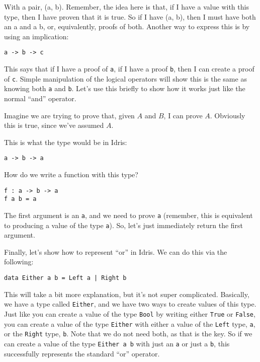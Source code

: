 \documentclass{article}
\newcommand{\inline}[1]{\texttt{#1}}
\begin{document}
With a pair, (a, b). Remember, the idea here is that, if I have a value with this type, then I have proven that it is true. So if I have (a, b), then I must have both an a and a b, or, equivalently, proofs of both. Another way to express this is by using an implication:

\begin{verbatim}
a -> b -> c
\end{verbatim}

This says that if I have a proof of \inline{a}, if I have a proof \inline{b}, then I can create a proof of \inline{c}.
Simple manipulation of the logical operators will show this is the same as knowing both \inline{a} and \inline{b}. %
Let’s use this briefly to show how it works just like the normal ``and'' operator.

Imagine we are trying to prove that, given $A$ and $B$, I can prove $A$.
Obviously this is true, since we've assumed $A$.

This is what the type would be in Idris:
\begin{verbatim}
a -> b -> a
\end{verbatim}

How do we write a function with this type?

\begin{verbatim}
f : a -> b -> a
f a b = a
\end{verbatim}

The first argument is an \inline{a}, and we need to prove \inline{a} (remember, this is equivalent to producing a value of the type \inline{a}).
So, let's just immediately return the first argument.

Finally, let’s show how to represent ``or'' in Idris.
We can do this via the following:

\begin{verbatim}
data Either a b = Left a | Right b
\end{verbatim}

This will take a bit more explanation, but it's not super complicated.
Basically, we have a type called \inline{Either}, and we have two ways to create values of this type.
Just like you can create a value of the type \inline{Bool} by writing either \inline{True} or \inline{False}, you can create a value of the type \inline{Either} with either a value of the \inline{Left} type, \inline{a}, or the \inline{Right} type, \inline{b}.
Note that we do not need both, as that is the key.
So if we can create a value of the type \inline{Either a b} with just an \inline{a} or just a \inline{b}, this successfully represents the standard ``or'' operator.
\end{document}
